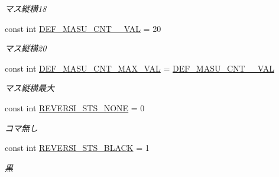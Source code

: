 \begin{DoxyCompactItemize}
\begin{DoxyCompactList}\small\item\em マス縦横18 \end{DoxyCompactList}\item 
\mbox{\label{class_reversi4color_wpf_1_1_reversi_const_aac22105871e76938d8ba055fabd03035}} 
const int \hyperlink{class_reversi4color_wpf_1_1_reversi_const_aac22105871e76938d8ba055fabd03035}{D\+E\+F\+\_\+\+M\+A\+S\+U\+\_\+\+C\+N\+T\+\_\+\_\+\+V\+AL} = 20
\begin{DoxyCompactList}\small\item\em マス縦横20 \end{DoxyCompactList}\item 
\mbox{\label{class_reversi4color_wpf_1_1_reversi_const_ac2443a1b533b0750c0a7c40ab612905a}} 
const int \hyperlink{class_reversi4color_wpf_1_1_reversi_const_ac2443a1b533b0750c0a7c40ab612905a}{D\+E\+F\+\_\+\+M\+A\+S\+U\+\_\+\+C\+N\+T\+\_\+\+M\+A\+X\+\_\+\+V\+AL} = \hyperlink{class_reversi4color_wpf_1_1_reversi_const_aac22105871e76938d8ba055fabd03035}{D\+E\+F\+\_\+\+M\+A\+S\+U\+\_\+\+C\+N\+T\+\_\+\_\+\+V\+AL}
\begin{DoxyCompactList}\small\item\em マス縦横最大 \end{DoxyCompactList}\item 
\mbox{\label{class_reversi4color_wpf_1_1_reversi_const_a4de827ef80e8015214124722ddb5a325}} 
const int \hyperlink{class_reversi4color_wpf_1_1_reversi_const_a4de827ef80e8015214124722ddb5a325}{R\+E\+V\+E\+R\+S\+I\+\_\+\+S\+T\+S\+\_\+\+N\+O\+NE} = 0
\begin{DoxyCompactList}\small\item\em コマ無し \end{DoxyCompactList}\item 
\mbox{\label{class_reversi4color_wpf_1_1_reversi_const_a8e55c857418acbef7c3e66d5dbea4a89}} 
const int \hyperlink{class_reversi4color_wpf_1_1_reversi_const_a8e55c857418acbef7c3e66d5dbea4a89}{R\+E\+V\+E\+R\+S\+I\+\_\+\+S\+T\+S\+\_\+\+B\+L\+A\+CK} = 1
\begin{DoxyCompactList}\small\item\em 黒 \end{DoxyCompactList}\item 

\end{DoxyCompactItemize}
